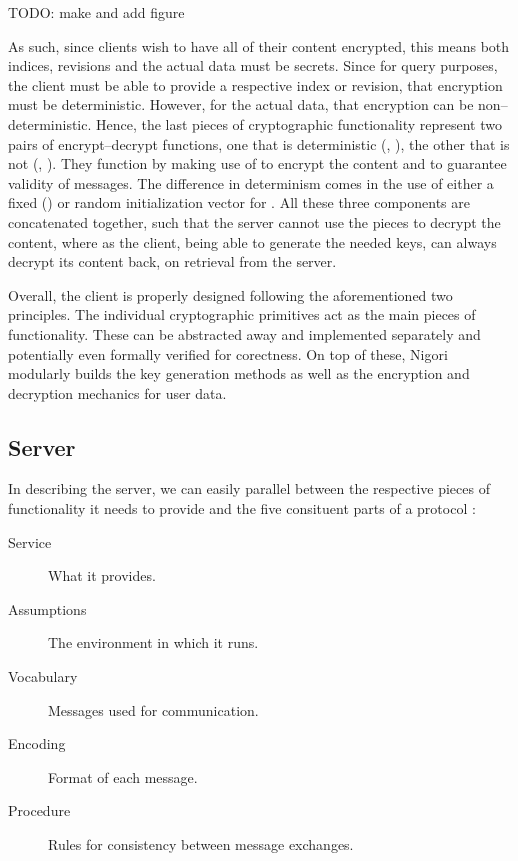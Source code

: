 TODO: make and add figure

As such, since clients wish to have all of their content encrypted, this means both indices, revisions and the actual data must be secrets.
Since for query purposes, the client must be able to provide a respective index or revision, that encryption must be deterministic.
However, for the actual data, that encryption can be non--deterministic.
Hence, the last pieces of cryptographic functionality represent two pairs of encrypt--decrypt functions, one that is deterministic (, ), the other that is not (, ).
They function by making use of  to encrypt the content and  to guarantee validity of messages.
The difference in determinism comes in the use of either a fixed () or random initialization vector for .
All these three components are concatenated together, such that the server cannot use the pieces to decrypt the content, where as the client, being able to generate the needed keys, can always decrypt its content back, on retrieval from the server.

Overall, the client is properly designed following the aforementioned two principles.
The individual cryptographic primitives act as the main pieces of functionality.
These can be abstracted away and implemented separately and potentially even formally verified for corectness.
On top of these, Nigori modularly builds the key generation methods as well as the encryption and decryption mechanics for user data.

\subsection{Server}
In describing the server, we can easily parallel between the respective pieces of functionality it needs to provide and the five consituent parts of a protocol \cite{ProtocolDesign}:
\begin{description}
  \item[Service] What it provides.
  \item[Assumptions] The environment in which it runs.
  \item[Vocabulary] Messages used for communication.
  \item[Encoding] Format of each message.
  \item[Procedure] Rules for consistency between message exchanges.
\end{description}

